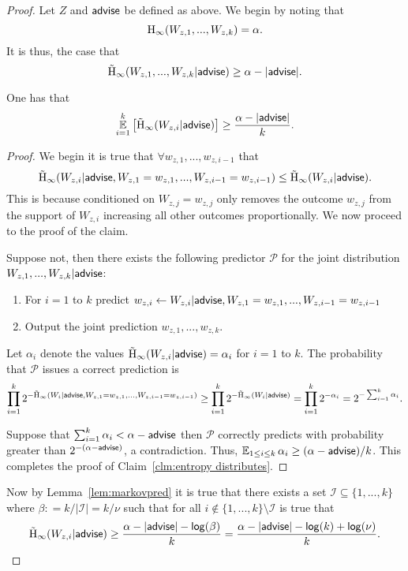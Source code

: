 \begin{proof}
Let $Z$ and ${\mathsf{advise}}$ be defined as above. We begin by noting that 
\[
\mathrm{H}_\infty(W_{z, 1},..., W_{z, k})=\alpha.
\]
 It is thus, the case that 
\[
\tilde{\mathrm{H}}_\infty(W_{z, 1},..., W_{z, k} | {\mathsf{advise}}) \ge \alpha - |{\mathsf{advise}}|.
\]
\begin{claim}
One has that 
\begin{align*}
\operatorname*{\mathbb{E}}_{i=1}^k \left[\tilde{\mathrm{H}}_\infty(W_{z, i} | {\mathsf{advise}})\right] \ge \frac{\alpha - |{\mathsf{advise}}|}{k}.
\end{align*}
\label{clm:entropy distributes}
\end{claim}
\begin{proof}
We begin it is true that $\forall w_{z,1},..., w_{z,i-1}$ that 
\[
\tilde{\mathrm{H}}_\infty(W_{z,i} | {\mathsf{advise}}, W_{z, 1}=w_{z,1},..., W_{z,i-1}=w_{z,i-1}) \le \tilde{\mathrm{H}}_\infty(W_{z,i} | {\mathsf{advise}}).
\]
This is because conditioned on $W_{z, j} =w_{z,j}$ only removes the outcome $w_{z,j}$ from the support of $W_{z,i}$ increasing all other outcomes proportionally.  
We now proceed to the proof of the claim. 

Suppose not, then there exists the following predictor $\mathcal{P}$ for the joint distribution $W_{z, 1},..., W_{z, k} | {\mathsf{advise}}$:
\begin{enumerate}
\item For $i=1$ to $k$ predict $w_{z,i}\leftarrow W_{z, i}| {\mathsf{advise}}, W_{z,1}=w_{z,1},..., W_{z,i-1}=w_{z,i-1}$
\item Output the joint prediction $w_{z,1},..., w_{z, k}$.  
\end{enumerate}
Let $\alpha_i$ denote the values $\tilde{\mathrm{H}}_\infty(W_{z,i}| {\mathsf{advise}}) = \alpha_i$ for $i=1$ to $k$. 
The probability that $\mathcal{P}$ issues a correct prediction is
\begin{align*}
\prod_{i=1}^k 2^{-\tilde{\mathrm{H}}_\infty(W_i | {\mathsf{advise}},  W_{z,1}=w_{z,1},..., W_{z,i-1}=w_{z,i-1})} \ge \prod_{i=1}^k 2^{-\tilde{\mathrm{H}}_\infty(W_i | {\mathsf{advise}})} = \prod_{i=1}^k 2^{-\alpha_i}  = 2^{-\sum_{i=1}^k \alpha_i}.
\end{align*}

\noindent
Suppose that $\sum_{i=1}^k \alpha_i < \alpha-{\mathsf{advise}}$ then $\mathcal{P}$ correctly predicts with probability greater than $2^{-(\alpha-{\mathsf{advise}})}$, a contradiction.  Thus, $\operatorname*{\mathbb{E}}_{1\le i\le k} \alpha_i \ge (\alpha-{\mathsf{advise}})/k$. 
This completes the proof of Claim~\ref{clm:entropy distributes}.
\end{proof}

\noindent
Now by Lemma~\ref{lem:markovpred} it is true that there exists a set $\mathcal{I}\subseteq \{1,...,k\}$ where $\beta: =  k/| \mathcal{I} | = k/\nu$ such that for all $i\not \in \{1,...,k\} \setminus\mathcal{I}$ is true that 
\[
\tilde{\mathrm{H}}_\infty(W_{z,i} | {\mathsf{advise}}) \ge \frac{\alpha -|{\mathsf{advise}}| - \mathsf{log}\!\left(\beta\right)}{k} = \frac{\alpha -|{\mathsf{advise}}| - \mathsf{log}\!\left(k\right) + \mathsf{log}\!\left(\nu\right)}{k}.
\]


\end{proof}
